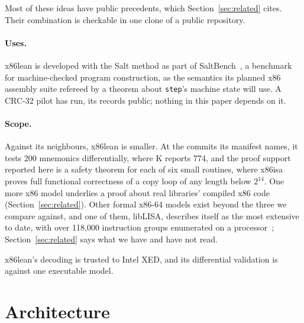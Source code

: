 \documentclass[runningheads]{llncs}
\newcommand{\src}[1]{}  %
\newcommand{\lean}[1]{\texttt{#1}}
\begin{document}
Most of these ideas have public precedents, which Section~\ref{sec:related} cites. Their
combination is checkable in one clone of a public repository.

\paragraph{Uses.}
x86lean is developed with the Salt method as part of SaltBench~\cite{saltbench}, a benchmark for machine-checked program construction,
as the semantics its planned x86 assembly suite refereed by a theorem about \lean{step}'s machine state will use. A
CRC-32 pilot has run, its records public; nothing in this paper depends on it.
\src{README.md, the section "Part of SaltBench"; saltbench harness/systems-x86/RESULT-x86-crc32-*.md (four files, 2026-09-26 and 2026-09-29)}

\paragraph{Scope.}
Against its neighbours, x86lean is smaller. At the commits its manifest names, it tests 200 mnemonics differentially, where K reports 774, and the proof support reported here is a safety theorem for each of
six small routines, where x86isa proves full functional correctness of a copy loop of any length below
$2^{14}$. One more x86 model underlies a proof about real libraries' compiled x86 code~\cite{anthropic-fv}
(Section~\ref{sec:related}).
Other formal x86-64 models exist beyond the three we compare against, and one of them, libLISA,
describes itself as the most extensive to date, with over 118{,}000 instruction groups enumerated on a
processor~\cite{liblisa}; Section~\ref{sec:related} says what we have and have not read.
\src{docs/CLAIMS.tsv[coverage\_mnemonics, k\_mnemonics, proof\_sample\_routines, liblisa\_groups]; docs/TACAS-G1-POSITIONING.md, the scale and proof-support rows and 1d; docs/DECISIONS.md D220}
x86lean's decoding is trusted to Intel XED, and its differential validation is against one executable model.

\section{Architecture}
\label{sec:model}
\end{document}

